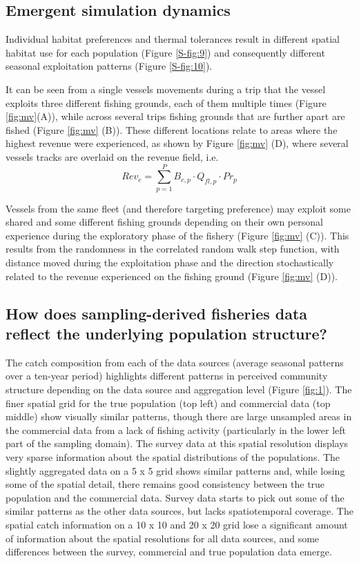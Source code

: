 \documentclass[review]{elsarticle}
\begin{document}
\subsection{Emergent simulation dynamics}

Individual habitat preferences and thermal tolerances result in different
spatial habitat use for each population (Figure \ref{S-fig:9}) and consequently
different seasonal exploitation patterns (Figure \ref{S-fig:10}). 

It can be seen from a single vessels movements during a trip that the vessel
exploits three different fishing grounds, each of them multiple times (Figure
\ref{fig:mv}(A)), while across several trips fishing grounds that are further
apart are fished (Figure \ref{fig:mv} (B)). These different locations relate to
areas where the highest revenue were experienced, as shown by Figure
\ref{fig:mv} (D), where several vessels tracks are overlaid on the revenue
field, i.e. $$Rev_{c} = \sum^P_{p=1} B_{c,p} \cdot Q_{fl,p} \cdot Pr_{p}$$

Vessels from the same fleet (and therefore targeting preference) may exploit
some shared and some different fishing grounds depending on their own personal
experience during the exploratory phase of the fishery (Figure \ref{fig:mv} (C)).
This results from the randomness in the correlated random walk step function,
with distance moved during the exploitation phase and the direction
stochastically related to the revenue experienced on the fishing ground (Figure
\ref{fig:mv} (D)). 

\subsection{How does sampling-derived fisheries data reflect the underlying
	population structure?}

The catch composition from each of the data sources (average seasonal patterns over a ten-year period) highlights
different patterns in perceived community structure depending on the data
source and aggregation level (Figure \ref{fig:1}). The finer spatial grid for
the true population (top left) and commercial data (top middle) show visually
similar patterns, though there are large unsampled areas in the commercial data
from a lack of fishing activity (particularly in the lower left part of the
sampling domain). The survey data at this spatial resolution displays very
sparse information about the spatial distributions of the populations. The
slightly aggregated data on a 5 x 5 grid shows similar patterns and, while
losing some of the spatial detail, there remains good consistency between the
true population and the commercial data. Survey data starts to pick out some of
the similar patterns as the other data sources, but lacks spatiotemporal
coverage. The spatial catch information on a 10 x 10 and 20 x 20 grid lose a
significant amount of information about the spatial resolutions for all data
sources, and some differences between the survey, commercial and true
population data emerge. \\
\end{document}
